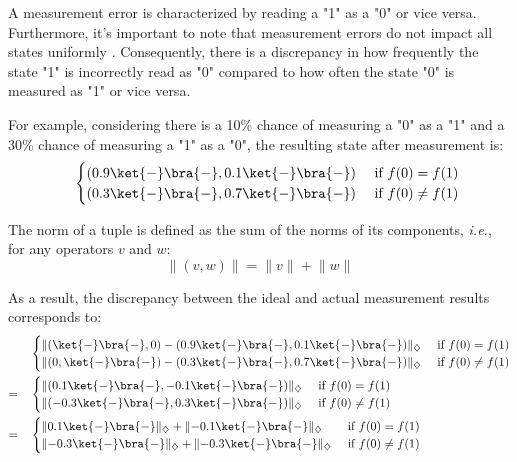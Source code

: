   
  A measurement error is characterized by reading a "1" as a "0" or vice versa. Furthermore, it's important to note that measurement errors do not impact all states uniformly \cite{tannu2019mitigating}. Consequently, there is a discrepancy in how frequently the state "1" is incorrectly read as "0" compared to how often the state "0" is measured as "1" or vice versa.
  
  For example, considering there is a 10\% chance of measuring a "0" as a "1" and a 30\% chance of measuring a "1" as a "0", the resulting state after measurement is:
  \begin{equation}
  \begin{split}
    \quad &
    \begin{cases}
     (0.9\ket{-} \bra{-},0.1\ket{-} \bra{-})  &\text{ if }   f(0)= f(1) \\
     (0.3\ket{-} \bra{-}, 0.7\ket{-} \bra{-}) &\text{ if }   f(0) \neq f(1) 
    \end{cases} \\
  \end {split}
  \end{equation}
  
  The norm of a tuple is defined as the sum of the norms of its components, \textit{i.e.}, for any operators $v$ and $w$:
  \begin{equation} \label{eq:norm_tuple}
    \lVert (v,w) \rVert = \lVert v \rVert + \lVert w \rVert
  \end{equation}
  
  As a result, the discrepancy between the ideal and actual measurement results corresponds to:
  \begin{equation}
    \begin{split}
      \quad &
      \begin{cases}
        \lVert(\ket{-} \bra{-},0) - (0.9\ket{-} \bra{-},0.1\ket{-} \bra{-})   \rVert_{\diamondsuit} &\text{ if }   f(0)= f(1) \\
        \lVert (0,\ket{-} \bra{-}) - (0.3\ket{-} \bra{-}, 0.7\ket{-} \bra{-}) \rVert_{\diamondsuit} &\text{ if }   f(0) \neq f(1) 
      \end{cases} \\
      = \quad &
      \begin{cases}
        \lVert(0.1\ket{-} \bra{-},-0.1\ket{-} \bra{-})   \rVert_{\diamondsuit} &\text{ if }   f(0)= f(1) \\
        \lVert (-0.3\ket{-} \bra{-}, 0.3\ket{-} \bra{-}) \rVert_{\diamondsuit} &\text{ if }   f(0) \neq f(1)
      \end{cases} \\
      = \quad &
      \begin{cases}
        \lVert 0.1\ket{-} \bra{-}\rVert_{\diamondsuit} + \lVert - 0.1 \ket{-} \bra{-}\rVert_{\diamondsuit} &\text{ if }   f(0)= f(1) \\
        \lVert -0.3\ket{-} \bra{-}\rVert_{\diamondsuit} + \lVert - 0.3 \ket{-} \bra{-}\rVert_{\diamondsuit} &\text{ if }   f(0) \neq f(1)
      \end{cases} \\
    \end {split}
    \end{equation}
  
